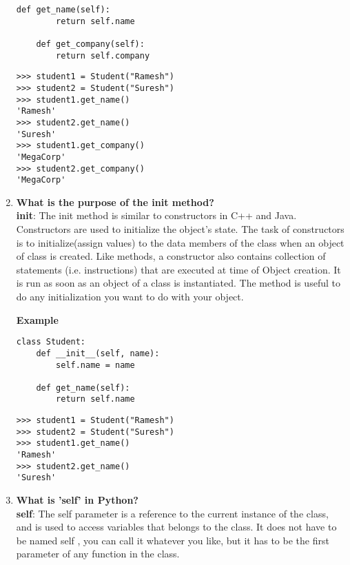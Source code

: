 \documentclass[11pt]{article}
\begin{document}
\begin{enumerate}
\begin{Verbatim}[commandchars=\\\{\}]
	def get_name(self):
		return self.name

	def get_company(self):
		return self.company
	      \end{Verbatim}

	      \begin{Verbatim}[commandchars=\\\{\}]
>>> student1 = Student("Ramesh")
>>> student2 = Student("Suresh")
>>> student1.get_name()
'Ramesh'
>>> student2.get_name()
'Suresh'
>>> student1.get_company()
'MegaCorp'
>>> student2.get_company()
'MegaCorp'
	      \end{Verbatim}

	\item \textbf{What is the purpose of the init method?}\\

	      \textbf{init}: The init method is similar to constructors in C++ and Java. Constructors are used to initialize the object's state. The task of constructors is to initialize(assign values) to the data members of the class when an object of class is created. Like methods, a constructor also contains collection of statements (i.e. instructions) that are executed at time of Object creation. It is run as soon as an object of a class is instantiated. The method is useful to do any initialization you want to do with your object.

	      \textbf{Example}

	      \begin{verbatim}
class Student:
	def __init__(self, name):
		self.name = name

	def get_name(self):
		return self.name
	      \end{verbatim}

	      \begin{verbatim}
>>> student1 = Student("Ramesh")
>>> student2 = Student("Suresh")
>>> student1.get_name()
'Ramesh'
>>> student2.get_name()
'Suresh'
	      \end{verbatim}

	\item \textbf{What is 'self' in Python?}\\

	      \textbf{self}: The self parameter is a reference to the current instance of the class, and is used to access variables that belongs to the class. It does not have to be named self , you can call it whatever you like, but it has to be the first parameter of any function in the class.



\end{enumerate}
\end{document}
